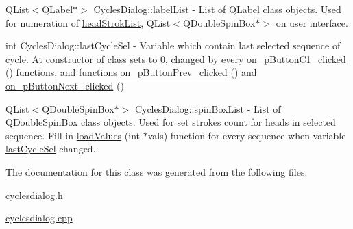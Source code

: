 \begin{DoxyCompactItemize}
{\footnotesize\ttfamily Q\+List$<$Q\+Label$\ast$$>$ Cycles\+Dialog\+::\texorpdfstring{label\+List}{labelList}{\ttfamily [private]}}
 - List of Q\+Label class objects. Used for numeration of \mbox{\hyperlink{classCyclesDialog_a1f87902a8d3b08aadc86fe1ef83ccca9}{head\+Strok\+List}}, Q\+List$<$Q\+Double\+Spin\+Box$\ast$$>$ on user interface. 
\item \mbox{\label{classCyclesDialog_a1b608c6d6ebf52a902645ee910f91ffa}} 
{\footnotesize\ttfamily int Cycles\+Dialog\+::\texorpdfstring{\texorpdfstring{last\+Cycle\+Sel}{lastCycleSel}}{lastCycleSel}{\ttfamily [private]}}
- Variable which contain last selected sequence of cycle. At constructor of class sets to 0, changed by every \mbox{\hyperlink{classCyclesDialog_a0ce26519321c0a05a2829861468575b8}{on\+\_\+p\+Button\+C1\+\_\+clicked}} () functions, and functions \mbox{\hyperlink{classCyclesDialog_a1e4ad2ee11ec162987d24e2071c3f5c4}{on\+\_\+p\+Button\+Prev\+\_\+clicked}} () and \mbox{\hyperlink{classCyclesDialog_a2f918e498a7c5cd77b12edb6923fb78d}{on\+\_\+p\+Button\+Next\+\_\+clicked}} ()
\item \mbox{\label{classCyclesDialog_a322448cc7948ab1d5fce41291fbfab5a}} 
{\footnotesize\ttfamily Q\+List$<$Q\+Double\+Spin\+Box$\ast$$>$ Cycles\+Dialog\+::\texorpdfstring{spin\+Box\+List}{spinBoxList}{\ttfamily [private]}}
 - List of Q\+Double\+Spin\+Box class objects. Used for set strokes count for heads in selected sequence. Fill in \mbox{\hyperlink{classCyclesDialog_ad25bef71c8a2219252c1458fa333a376}{load\+Values}} (int $\ast$vals) function for every sequence when variable \mbox{\hyperlink{classCyclesDialog_a1b608c6d6ebf52a902645ee910f91ffa}{last\+Cycle\+Sel}} changed.
\end{DoxyCompactItemize}

The documentation for this class was generated from the following files\+:\begin{DoxyCompactItemize}
\item 
\mbox{\hyperlink{cyclesdialog_8h}{cyclesdialog.\+h}}\item 
\mbox{\hyperlink{cyclesdialog_8cpp}{cyclesdialog.\+cpp}}\end{DoxyCompactItemize}
\newpage